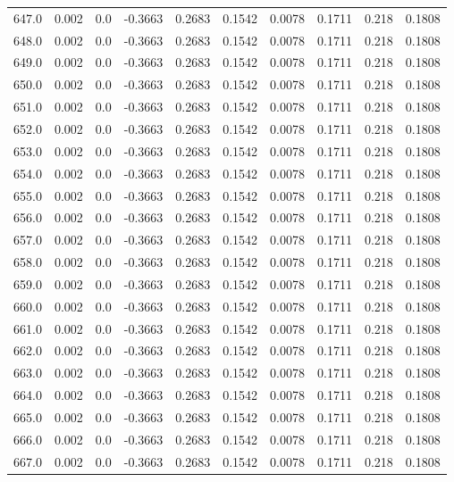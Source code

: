 \begin{longtable}{lrrrrrrrrr}
647.0 & 0.002 & 0.0 & -0.3663 & 0.2683 & 0.1542 & 0.0078 & 0.1711 & 0.218 & 0.1808 \\
648.0 & 0.002 & 0.0 & -0.3663 & 0.2683 & 0.1542 & 0.0078 & 0.1711 & 0.218 & 0.1808 \\
649.0 & 0.002 & 0.0 & -0.3663 & 0.2683 & 0.1542 & 0.0078 & 0.1711 & 0.218 & 0.1808 \\
650.0 & 0.002 & 0.0 & -0.3663 & 0.2683 & 0.1542 & 0.0078 & 0.1711 & 0.218 & 0.1808 \\
651.0 & 0.002 & 0.0 & -0.3663 & 0.2683 & 0.1542 & 0.0078 & 0.1711 & 0.218 & 0.1808 \\
652.0 & 0.002 & 0.0 & -0.3663 & 0.2683 & 0.1542 & 0.0078 & 0.1711 & 0.218 & 0.1808 \\
653.0 & 0.002 & 0.0 & -0.3663 & 0.2683 & 0.1542 & 0.0078 & 0.1711 & 0.218 & 0.1808 \\
654.0 & 0.002 & 0.0 & -0.3663 & 0.2683 & 0.1542 & 0.0078 & 0.1711 & 0.218 & 0.1808 \\
655.0 & 0.002 & 0.0 & -0.3663 & 0.2683 & 0.1542 & 0.0078 & 0.1711 & 0.218 & 0.1808 \\
656.0 & 0.002 & 0.0 & -0.3663 & 0.2683 & 0.1542 & 0.0078 & 0.1711 & 0.218 & 0.1808 \\
657.0 & 0.002 & 0.0 & -0.3663 & 0.2683 & 0.1542 & 0.0078 & 0.1711 & 0.218 & 0.1808 \\
658.0 & 0.002 & 0.0 & -0.3663 & 0.2683 & 0.1542 & 0.0078 & 0.1711 & 0.218 & 0.1808 \\
659.0 & 0.002 & 0.0 & -0.3663 & 0.2683 & 0.1542 & 0.0078 & 0.1711 & 0.218 & 0.1808 \\
660.0 & 0.002 & 0.0 & -0.3663 & 0.2683 & 0.1542 & 0.0078 & 0.1711 & 0.218 & 0.1808 \\
661.0 & 0.002 & 0.0 & -0.3663 & 0.2683 & 0.1542 & 0.0078 & 0.1711 & 0.218 & 0.1808 \\
662.0 & 0.002 & 0.0 & -0.3663 & 0.2683 & 0.1542 & 0.0078 & 0.1711 & 0.218 & 0.1808 \\
663.0 & 0.002 & 0.0 & -0.3663 & 0.2683 & 0.1542 & 0.0078 & 0.1711 & 0.218 & 0.1808 \\
664.0 & 0.002 & 0.0 & -0.3663 & 0.2683 & 0.1542 & 0.0078 & 0.1711 & 0.218 & 0.1808 \\
665.0 & 0.002 & 0.0 & -0.3663 & 0.2683 & 0.1542 & 0.0078 & 0.1711 & 0.218 & 0.1808 \\
666.0 & 0.002 & 0.0 & -0.3663 & 0.2683 & 0.1542 & 0.0078 & 0.1711 & 0.218 & 0.1808 \\
667.0 & 0.002 & 0.0 & -0.3663 & 0.2683 & 0.1542 & 0.0078 & 0.1711 & 0.218 & 0.1808 \\

\end{longtable}
